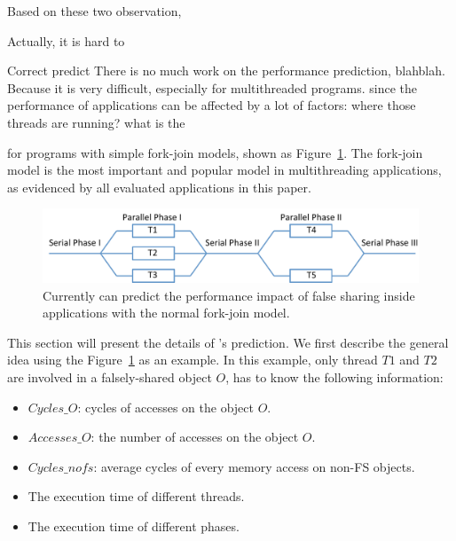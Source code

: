 Based on these two observation, 


Actually, it is hard to 

Correct predict 
There is no much work on the performance prediction, blahblah. 
Because it is very difficult, especially for multithreaded programs.  since the performance of applications can be affected by a lot of factors: where those threads are running? what is the 

 for programs with simple fork-join models, shown as Figure~\ref{fig:forkjoinmodel}. 
The fork-join model is the most important and popular model in multithreading applications, as evidenced by all evaluated applications in this paper. 

\begin{figure}[ht!]
\begin{center}
\includegraphics[width=6.5in]{figure/forkjoin}
\end{center}
\caption{Currently \Cheetah{} can predict the performance impact of false sharing inside applications with the normal fork-join model.
\label{fig:forkjoinmodel}}
\end{figure}



This section will present the details of \cheetah{}'s prediction. We first describe the general idea using the Figure~\ref{fig:forkjoinmodel} as an example. In this example, only thread $T1$ and $T2$ are involved in a falsely-shared object $O$, \cheetah{} has to know the following information:

\begin{itemize}
\item $Cycles\_O$: cycles of accesses on the object $O$.
\item $Accesses\_O$: the number of accesses on the object $O$.  
\item $Cycles\_{nofs}$: average cycles of every memory access on non-FS objects. 
\item The execution time of different threads.  
\item The execution time of different phases. 
\end{itemize}

